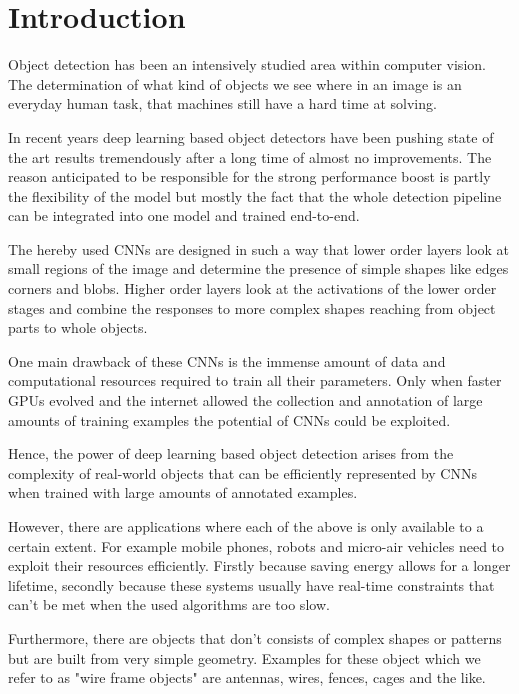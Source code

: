 \chapter{Introduction}
\label{sec:intro}

Object detection has been an intensively studied area within computer vision. The determination of what kind of objects we see where in an image is an everyday human task, that machines still have a hard time at solving.

In recent years deep learning based object detectors have been pushing state of the art results tremendously after a long time of almost no improvements. The reason anticipated to be responsible for the strong performance boost is partly the flexibility of the model but mostly the fact that the whole detection pipeline can be integrated into one model and trained end-to-end.

The hereby used \acp{CNN} are designed in such a way that lower order layers look at small regions of the image and determine the presence of simple shapes like edges corners and blobs. Higher order layers look at the activations of the lower order stages and combine the responses to more complex shapes reaching from object parts to whole objects.

One main drawback of these \acp{CNN} is the immense amount of data and computational resources required to train all their parameters. Only when faster \acp{GPU} evolved and the internet allowed the collection and annotation of large amounts of training examples the potential of \acp{CNN} could be exploited. 

Hence, the power of deep learning based object detection arises from the complexity of real-world objects that can be efficiently represented by \acp{CNN} when trained with large amounts of annotated examples.

However, there are applications where each of the above is only available to a certain extent. For example mobile phones, robots and micro-air vehicles need to exploit their resources efficiently. Firstly because saving energy allows for a longer lifetime, secondly because these systems usually have real-time constraints that can't be met when the used algorithms are too slow.

Furthermore, there are objects that don't consists of complex shapes or patterns but are built from very simple geometry. Examples for these object which we refer to as "wire frame objects" are antennas, wires, fences, cages and the like. 

